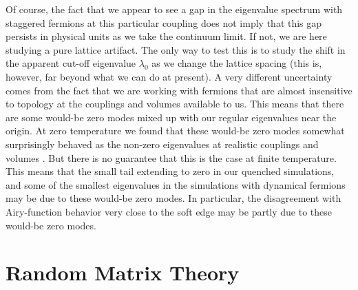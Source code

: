 \documentclass[11pt]{article}
\newcommand{\noi}{\vspace{12pt}\noindent}
\begin{document}
\noi
Of course, the fact that we appear to see a gap in the eigenvalue
spectrum with staggered fermions at this particular coupling does not
imply that this gap persists in physical units as we take the continuum
limit. If not, we are here studying a pure lattice artifact. The only
way to test this is to study the shift in the apparent cut-off
eigenvalue $\lambda_0$ as we change the lattice spacing (this is, however,
far beyond what we can do at present). A very different uncertainty
comes from the fact that we are working with fermions that are almost
insensitive to topology at the couplings and volumes available to us.
This means that there are some would-be zero modes mixed up with our
regular eigenvalues near the origin. At zero temperature we found that
these would-be zero modes somewhat surprisingly behaved as the non-zero
eigenvalues at realistic couplings and volumes \cite{DHNR}. But there
is no guarantee that this is the case at finite temperature. This means
that the small tail extending to zero in our quenched simulations, and
some of the smallest eigenvalues in the simulations with dynamical
fermions may be due to these would-be zero modes. In particular, the
disagreement with Airy-function behavior very close to the soft edge
may be partly due to these would-be zero modes. 


\section{Random Matrix Theory}
\label{RMT}
\end{document}
